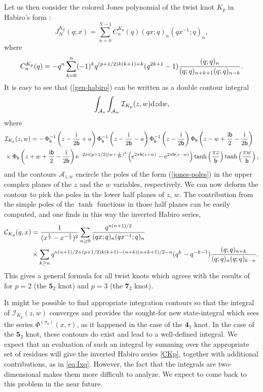 \documentclass[12pt,reqno]{amsart}
\theoremstyle{definition}
\def\be{\begin{equation}}
\def\ee{\end{equation}}
\def\ri{\mathrm{i}}
\def\re{{\rm e}}
\def\ri{{\rm i}}
\def\mc{\mathcal}
\def\md{\mathbf}
\newcommand{\knot}[1]{\md{#1}}
\newcommand{\fad}{\operatorname{\Phi}_{\mathsf{b}}}
\newcommand{\mb}{{\mathsf{b}}}
\begin{document}
Let us then consider the colored Jones polynomial of the twist knot $K_p$ in
Habiro's form \cite{Mas:HabPol}:
%
\be
\label{gen-habiro}
J^{K_p}_N (q;x)= \sum_{n=0}^{N-1} C^{K_p}_n (q) (qx;q)_n (q x^{-1};q)_n, 
\ee
%
where
%
\be
C^{K_p}_n(q)= -q^n \sum_{k=0}^n (-1)^k
q^{(p+1/2)k(k+1) +k } (q^{2k+1}-1) {(q;q)_n \over (q;q)_{n+k+1} (q;q)_{n-k}}. 
\ee
%
It is easy to see that (\ref{gen-habiro}) can be written as a double contour integral 
%
\be
\int_{\mc{A}_z} \int_{\mc{A}_w} \mc{I}_{K_p}(z,w) {\rm d} z {\rm d} w, 
\ee
%
where 
%
\be
\begin{aligned}
  &\mc{I}_{K_p} (z, w)=-\fad^{-1} \left(z-{\ri \over 2 \mb} + u \right)
  \fad^{-1} \left(z-{\ri \over 2 \mb} - u\right) \fad ^{-1}
  \left(z-{\ri \over 2 \mb} \right) \fad
  \left(z-w+ {\ri \mb \over 2} -{\ri \over  2 \mb} \right)  \\
& \times 
\fad \left(z+w+ {\ri \mb \over 2} -{\ri \over  2\mb}  \right)
\re^{-2 \pi \ri (p+1/2)(w+ {\ri \over 2 \mb})^2} \left( \re^{ 2 \pi \mb (z+w)}
  - \re^{ 2 \pi \mb (z-w)} \right) \tanh\left( {\pi z \over \mb} \right)
\tanh\left( {\pi w \over \mb} \right),
\end{aligned}
\ee
%
and the contours $\mc{A}_{z,w}$ encircle the poles of the form (\ref{jones-poles}) in
the upper complex planes of the $z$ and the $w$ variables, respectively. We can now
deform the contour to pick the poles in the lower half planes of $z$, $w$. The
contribution from the simple poles of the $\tanh$ functions in those half planes can
be easily computed, and one finds in this way the inverted Habiro series, 
%
\be
\label{CKp}
\begin{aligned}
  \mc{C}_{K_p} (q, x)&={1 \over (x^{1\over 2}- x^{-{1\over 2}})^2}
  \sum_{n \ge 0} { q^{n (n+1)/2} \over (q x;q)_n (q x^{-1};q)_n} \\
  & \times \sum_{k \ge n}  q^{n (n+1)/2 + (p+1/2) k(k+1)- (n+k)(n+k+1)/2-n}
  (q^k - q^{-k-1}) {(q;q)_{n+k} \over (q;q)_n (q;q)_{k-n}}. 
\end{aligned}
\ee
%
This gives a general formula for all twist knots which agrees with the results
of \cite{park-inverted} for $p=2$ (the ${\knot{5}_2}$ knot) and $p=3$ 
(the ${\knot{7}_2}$ knot). 

It might be possible to find appropriate integration contours so that the integral
of $\mc{I}_{K_p} (z, w)$ converges and provides the sought-for new state-integral
which sees the series $\Phi^{(\sigma_0)} (x, \tau)$, as it happened in the case of the
${\knot{4}_1}$ knot. In the case of the ${\knot{5}_2}$ knot, these contours do exist
and lead to a well-defined integral. We expect that an evaluation of such an integral
by summing over the appropriate set of residues will give the inverted Habiro
series \eqref{CKp}, together with additional contributions, as in \eqref{eq:Ixq}.
However, the fact that the integrals are two-dimensional makes them more difficult
to analyze. We expect to come back to this problem in the near future. 
\end{document}
